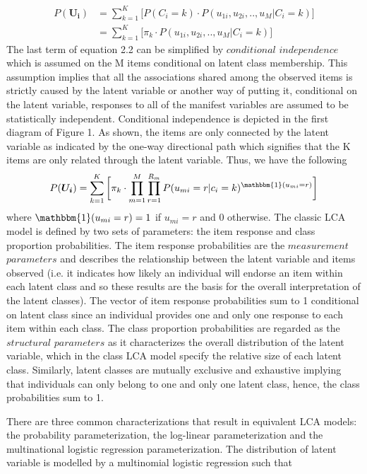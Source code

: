 \begin{align}
P(\bm{U_{i}}) &= \sum_{k=1}^{K} \bigg[ P(C_{i}=k) \cdot P(u_{1i},u_{2i},..,u_{M}|C_{i}=k)\bigg] \\
&=\sum_{k=1}^{K} \bigg[ \pi_{k} \cdot P(u_{1i},u_{2i},..,u_{M}|C_{i}=k)\bigg]
\end{align}
The last term of equation 2.2 can be simplified by $conditional$ $independence$ which is assumed on the M items conditional on latent class membership. This assumption implies that all the associations shared among the observed items is strictly caused by the latent variable or another way of putting it, conditional on the latent variable, responses to all of the manifest variables are assumed to be statistically independent. Conditional independence is depicted in the first diagram of Figure 1. As shown, the items are only connected by the latent variable as indicated by the one-way directional path which signifies that the K items are only related through the latent variable. Thus, we have the following 
\begin{align}
P(\bm{U_{i}}) = \sum_{k=1}^{K} \bigg[ \pi_{k} \cdot  \prod_{m=1}^{M}\prod_{r=1}^{R_{m}} P(u_{mi}=r|c_{i}=k)^{\mathbbm{1}(u_{mi} = r)} \bigg ]
\end{align}
where $\mathbbm{1}(u_{mi} = r)=1$ if $u_{mi}=r$ and $0$ otherwise. The classic LCA model is defined by two sets of parameters: the item response and class proportion probabilities. The item response probabilities are the $measurement$ $parameters$ and describes the relationship between the latent variable and items observed (i.e. it indicates how likely an individual will endorse an item within each latent class and so these results are the basis for the overall interpretation of the latent classes). The vector of item response probabilities sum to 1 conditional on latent class since an individual provides one and only one response to each item within each class. The class proportion probabilities are regarded as the $structural$ $parameters$ as it characterizes the overall distribution of the latent variable, which in the class LCA model specify the relative size of each latent class. Similarly, latent classes are mutually exclusive and exhaustive implying that individuals can only belong to one and only one latent class, hence, the class probabilities sum to 1. 

There are three common characterizations that result in equivalent LCA models: the probability parameterization, the log-linear parameterization and the multinational logistic regression parameterization. The distribution of latent variable is modelled by a multinomial logistic regression such that 

